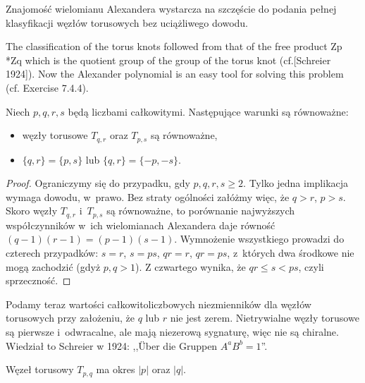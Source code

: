 Znajomość wielomianu Alexandera wystarcza na szczęście do podania pełnej klasyfikacji węzłów torusowych bez uciążliwego dowodu.

\begin{tobedone}
    The classification of the torus knots followed from that of the free product Zp *Zq which is the quotient group of the group of the torus knot (cf.[Schreier 1924]).
    Now the Alexander polynomial is an easy tool for solving this problem (cf. Exercise 7.4.4).
\end{tobedone}

\begin{proposition}
    Niech $p, q, r, s$ będą liczbami całkowitymi.
    Następujące warunki są równoważne:
    \begin{itemize}
        \item węzły torusowe $T_{q, r}$ oraz $T_{p, s}$ są równoważne,
        \item $\{q, r\} = \{p, s\}$ lub $\{q, r\} = \{-p, -s\}$.
    \end{itemize}
\end{proposition}

\begin{proof}
    Ograniczymy się do przypadku, gdy $p, q, r, s \ge 2$.
    Tylko jedna implikacja wymaga dowodu, w~prawo.
    Bez straty ogólności załóżmy więc, że $q > r$, $p > s$.
    Skoro węzły $T_{q, r}$ i~$T_{p,s}$ są równoważne, to porównanie najwyższych współczynników w~ich wielomianach Alexandera daje równość $(q-1)(r-1) = (p-1)(s-1)$.
    Wymnożenie wszystkiego prowadzi do czterech przypadków: $s = r$, $s = ps$, $qr = r$, $qr = ps$, z~których dwa środkowe nie mogą zachodzić (gdyż $p, q > 1$).
    Z czwartego wynika, że $qr \le s < ps$, czyli sprzeczność.
\end{proof}

Podamy teraz wartości całkowitoliczbowych niezmienników dla węzłów torusowych przy założeniu, że $q$ lub $r$ nie jest zerem.
Nietrywialne węzły torusowe są pierwsze i~odwracalne, ale mają niezerową sygnaturę, więc nie są chiralne.
Wiedział to Schreier w 1924: ,,Über die Gruppen $A^a B^b = 1$''.

\begin{proposition}
    Węzeł torusowy $T_{p, q}$ ma okres $|p|$ oraz $|q|$.
\end{proposition}

